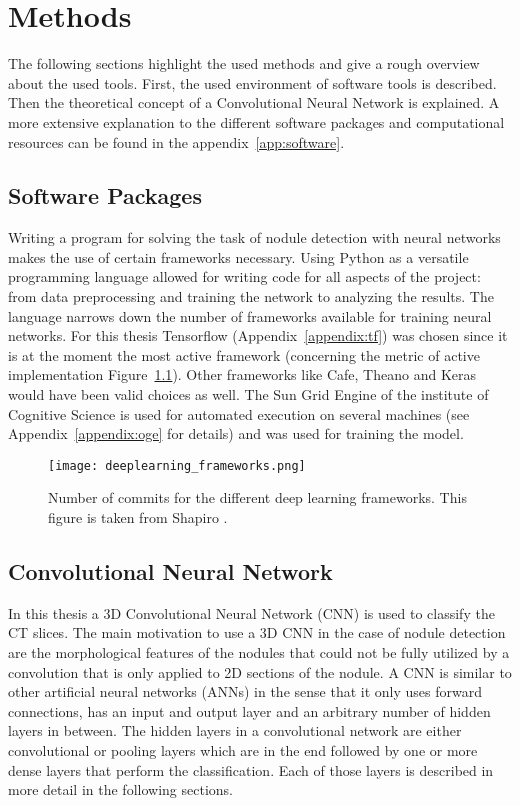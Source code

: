 \documentclass[main.tex]{subfiles}
\begin{document}
\chapter{Methods}\label{chap:methods}
The following sections highlight the used methods and give a rough overview about the used tools. First, the used environment of software tools is described. Then the theoretical concept of a Convolutional Neural Network is explained. A more extensive explanation to the different software packages and computational resources can be found in the appendix~\ref{app:software}.

\section{Software Packages}
Writing a program for solving the task of nodule detection with neural networks makes the use of certain frameworks necessary. Using Python as a versatile programming language allowed for writing code for all aspects of the project: from data preprocessing and training the network to analyzing the results. The language narrows down the number of frameworks available for training neural networks. For this thesis Tensorflow (Appendix~\ref{appendix:tf}) was chosen since it is at the moment the most active framework (concerning the metric of active implementation Figure~\ref{fig:frameworks}). Other frameworks like Cafe, Theano and Keras would have been valid choices as well. The Sun Grid Engine of the institute of Cognitive Science is used for automated execution on several machines (see Appendix~\ref{appendix:oge} for details) and was used for training the model.

\begin{figure}
\begin{center}
\texttt{[image: deeplearning\_frameworks.png]}
\end{center}
\caption{Number of commits for the different deep learning frameworks. This figure is taken from Shapiro \cite{shapiro2017}.}
\label{fig:frameworks}
\end{figure}


\section{Convolutional Neural Network}
In this thesis a 3D Convolutional Neural Network (CNN) is used to classify the CT slices. The main motivation to use a 3D CNN in the case of nodule detection are the morphological features of the nodules that could not be fully utilized by a convolution that is only applied to 2D sections of the nodule. A CNN is similar to other artificial neural networks (ANNs) in the sense that it only uses forward connections, has an input and output layer and an arbitrary number of hidden layers in between. The hidden layers in a convolutional network are either convolutional or pooling layers which are in the end followed by one or more dense layers that perform the classification. Each of those layers is described in more detail in the following sections.
\end{document}
